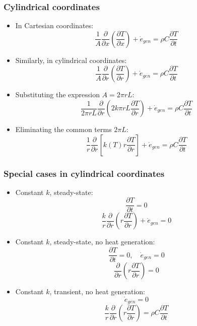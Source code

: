 \documentclass[11pt]{article}
\begin{document}
\subsubsection{Cylindrical coordinates}
\label{sec:org8d8438f}
\begin{itemize}
\item In Cartesian coordinates:
\[\frac{1}{A} \frac{\partial}{\partial x} \left(\frac{\partial T}{\partial x} \right) + \dot{e}_{gen} = \rho C \frac{\partial T}{\partial t}\]
\item Similarly, in cylindrical coordinates:
\[\frac{1}{A} \frac{\partial}{\partial r} \left(\frac{\partial T}{\partial r} \right) + \dot{e}_{gen} = \rho C \frac{\partial T}{\partial t}\]
\item Substituting the expression \(A = 2 \pi r L\):
\[\frac{1}{2 \pi r L} \frac{\partial}{\partial r} \left(2k \pi r L \frac{\partial T}{\partial r} \right) + \dot{e}_{gen} = \rho C \frac{\partial T}{\partial t}\]
\item Eliminating the common terms \(2 \pi L\):
\[\frac{1}{r} \frac{\partial}{\partial r} \left[k(T) r \frac{\partial T}{\partial r} \right] + \dot{e}_{gen} = \rho C \frac{\partial T}{\partial t}\]
\end{itemize}

\subsubsection{Special cases in cylindrical coordinates}
\label{sec:org0d3b8c0}
\begin{itemize}
\item Constant \(k\), steady-state:
\[\frac{\partial T}{\partial t} = 0\]
\[\frac{k}{r} \frac{\partial}{\partial r} \left(r \frac{\partial T}{\partial r} \right) + \dot{e}_{gen} = 0\]
\item Constant \(k\), steady-state, no heat generation:
\[\frac{\partial T}{\partial t} = 0, \quad \dot{e}_{gen} = 0\]
\[\frac{\partial}{\partial r} \left(r \frac{\partial T}{\partial r} \right) = 0\]
\item Constant \(k\), transient, no heat generation:
\[\dot{e}_{gen} = 0\]
\[\frac{k}{r} \frac{\partial}{\partial r} \left(r \frac{\partial T}{\partial r} \right) = \rho C \frac{\partial T}{\partial t}\]
\end{itemize}
\end{document}
